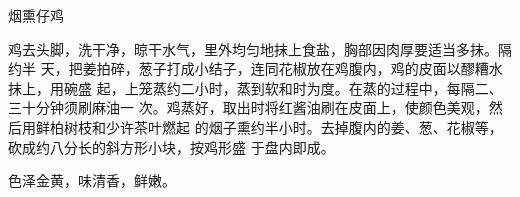 %
%
%
%
%
%
%
\begin{recipe}{烟熏仔鸡}

\ingredients


\preparation

鸡去头脚，洗干净，晾干水气，里外均匀地抹上食盐，胸部因肉厚要适当多抹。隔约半
天，把姜拍碎，葱子打成小结子，连同花椒放在鸡腹内，鸡的皮面以醪糟水抹上，用碗盛
起，上笼蒸约二小时，蒸到软和时为度。在蒸的过程中，每隔二、三十分钟须刷麻油一
次。鸡蒸好，取出时将红酱油刷在皮面上，使颜色美观，然后用鲜柏树枝和少许茶叶燃起
的烟子熏约半小时。去掉腹内的姜、葱、花椒等，砍成约八分长的斜方形小块，按鸡形盛
于盘内即成。

\features

色泽金黄，味清香，鲜嫩。

\end{recipe}

